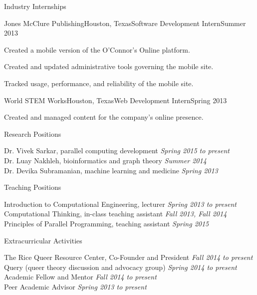 \documentclass{resume}
\begin{document}
\begin{rSection}{Industry Internships}

\begin{rSubsection}{Jones McClure Publishing}{Houston, Texas}{Software Development Intern}{Summer 2013}
\item Created a mobile version of the O'Connor's Online platform.
\item Created and updated administrative tools governing the mobile site.
\item Tracked usage, performance, and reliability of the mobile site.
\end{rSubsection}

\begin{rSubsection}{World STEM Works}{Houston, Texas}{Web Development Intern}{Spring 2013}
\item Created and managed content for the company's online presence.
\end{rSubsection}

\end{rSection}





\begin{rSection}{Research Positions}

Dr. Vivek Sarkar, parallel computing development \hfill {\em Spring 2015 to present} \\
Dr. Luay Nakhleh, bioinformatics and graph theory \hfill {\em Summer 2014} \\
Dr. Devika Subramanian, machine learning and medicine \hfill {\em Spring 2013}

\end{rSection}





\begin{rSection}{Teaching Positions}

Introduction to Computational Engineering, lecturer \hfill {\em Spring 2013 to present} \\
Computational Thinking, in-class teaching assistant \hfill {\em Fall 2013, Fall 2014} \\
Principles of Parallel Programming,  teaching assistant \hfill {\em Spring 2015}

\end{rSection}





\begin{rSection}{Extracurricular Activities}

The Rice Queer Resource Center, Co-Founder and President \hfill {\em Fall 2014 to present} \\
Query (queer theory discussion and advocacy group) \hfill {\em Spring 2014 to present} \\
Academic Fellow and Mentor \hfill {\em Fall 2014 to present} \\
Peer Academic Advisor \hfill {\em Spring 2013 to present}

\end{rSection}
\end{document}
